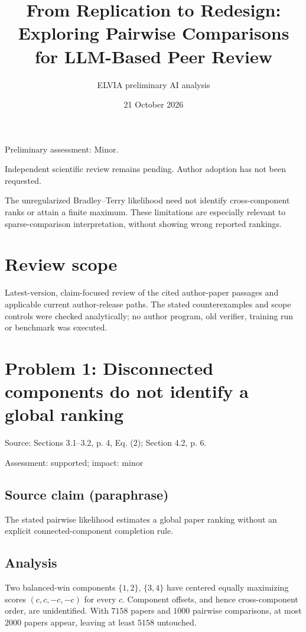 \documentclass[11pt]{article}
\begin{document}
\title{From Replication to Redesign: Exploring Pairwise Comparisons for LLM-Based Peer Review}

\author{ELVIA preliminary AI analysis}\date{21 October 2026}\maketitle

Preliminary assessment: Minor.\par

Independent scientific review remains pending. Author adoption has not been requested.

The unregularized Bradley–Terry likelihood need not identify cross-component ranks or attain a finite maximum. These limitations are especially relevant to sparse-comparison interpretation, without showing wrong reported rankings.

\section*{Review scope}

Latest-version, claim-focused review of the cited author-paper passages and applicable current author-release paths. The stated counterexamples and scope controls were checked analytically; no author program, old verifier, training run or benchmark was executed.

\section*{Problem 1: Disconnected components do not identify a global ranking}

Source: Sections 3.1–3.2, p. 4, Eq. (2); Section 4.2, p. 6.

Assessment: supported; impact: minor

\subsection*{Source claim (paraphrase)}

The stated pairwise likelihood estimates a global paper ranking without an explicit connected-component completion rule.

\subsection*{Analysis}

Two balanced-win components \(\{1,2\}\), \(\{3,4\}\) have centered equally maximizing scores \((c,c,-c,-c)\) for every \(c\). Component offsets, and hence cross-component order, are unidentified. With \(7158\) papers and \(1000\) pairwise comparisons, at most \(2000\) papers appear, leaving at least \(5158\) untouched.
\end{document}
